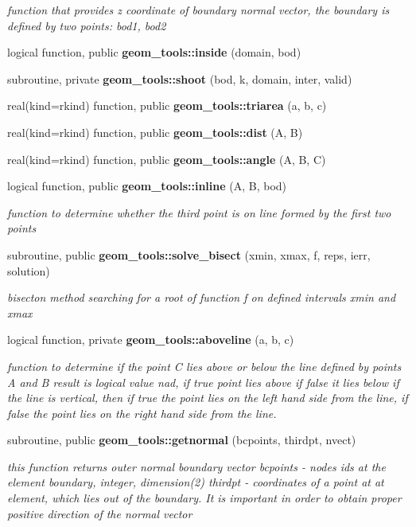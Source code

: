 \begin{DoxyCompactItemize}
\begin{DoxyCompactList}\small\item\em function that provides z coordinate of boundary normal vector, the boundary is defined by two points\+: bod1, bod2 \end{DoxyCompactList}\item 
logical function, public {\bf geom\+\_\+tools\+::inside} (domain, bod)
\item 
subroutine, private {\bf geom\+\_\+tools\+::shoot} (bod, k, domain, inter, valid)
\item 
real(kind=rkind) function, public {\bf geom\+\_\+tools\+::triarea} (a, b, c)
\item 
real(kind=rkind) function, public {\bf geom\+\_\+tools\+::dist} (A, B)
\item 
real(kind=rkind) function, public {\bf geom\+\_\+tools\+::angle} (A, B, C)
\item 
logical function, public {\bf geom\+\_\+tools\+::inline} (A, B, bod)
\begin{DoxyCompactList}\small\item\em function to determine whether the third point is on line formed by the first two points \end{DoxyCompactList}\item 
subroutine, public {\bf geom\+\_\+tools\+::solve\+\_\+bisect} (xmin, xmax, f, reps, ierr, solution)
\begin{DoxyCompactList}\small\item\em bisecton method searching for a root of function f on defined intervals xmin and xmax \end{DoxyCompactList}\item 
logical function, private {\bf geom\+\_\+tools\+::aboveline} (a, b, c)
\begin{DoxyCompactList}\small\item\em function to determine if the point C lies above or below the line defined by points A and B result is logical value nad, if true point lies above if false it lies below if the line is vertical, then if true the point lies on the left hand side from the line, if false the point lies on the right hand side from the line. \end{DoxyCompactList}\item 
subroutine, public {\bf geom\+\_\+tools\+::getnormal} (bcpoints, thirdpt, nvect)
\begin{DoxyCompactList}\small\item\em this function returns outer normal boundary vector bcpoints -\/ nodes ids at the element boundary, integer, dimension(2) thirdpt -\/ coordinates of a point at at element, which lies out of the boundary. It is important in order to obtain proper positive direction of the normal vector \end{DoxyCompactList}\item 

\end{DoxyCompactItemize}
